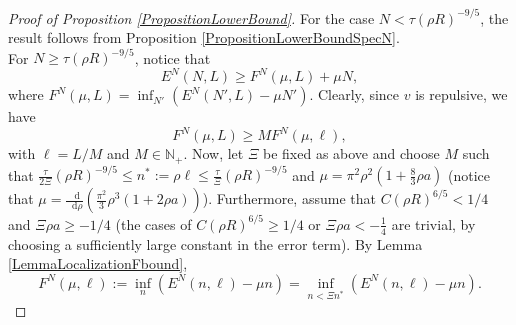 \documentclass[a4paper,11pt]{article}
\newcommand*\diff{\mathop{}\!\mathrm{d}}
\numberwithin{equation}{section}
\begin{document}
	\begin{proof}[Proof of Proposition \ref{PropositionLowerBound}]
		For the case $ N<\tau (\rho R)^{-9/5} $, the result follows from Proposition \ref{PropositionLowerBoundSpecN}.\\
		For $ N\geq \tau (\rho R)^{-9/5} $, notice that \begin{equation}
			E^N(N,L)\geq F^N(\mu,L)+\mu N,
		\end{equation}
		where $ F^N(\mu,L)=\inf_{N'}\left(E^N(N',L)-\mu N'\right) $. Clearly, since $v$ is repulsive, we have \begin{equation}
			F^N(\mu,L)\geq M F^N(\mu,\ell)\label{EqLocalizationF},
		\end{equation}
		with $ \ell=L/M $ and $ M\in \mathbb{N}_+ $. 
		Now, let $\Xi$ be fixed as above and choose $ M $ such that $ \frac{\tau}{2\Xi}\left(\rho R\right)^{-9/5}\leq n^*:=\rho\ell\leq \frac{\tau}{\Xi}\left(\rho R\right)^{-9/5} $ and $ \mu=\pi^2\rho^2\left(1+\frac{8}{3}\rho a\right) $ (notice that $ \mu=\frac{\diff}{\diff \rho}(\frac{\pi^2}{3}\rho^3(1+2\rho a))$). Furthermore, assume that $ C(\rho R)^{6/5}<  1/4 $ and $\Xi\rho a\geq -1/4$ (the cases of $ C(\rho R)^{6/5}\geq  1/4 $ or $ \Xi\rho a<-\frac{1}{4} $ are trivial, by choosing a sufficiently large constant in the error term). By Lemma \ref{LemmaLocalizationFbound},  \begin{equation}
			F^N(\mu,\ell):=\inf_{n}\left(E^N(n,\ell)-\mu n\right)=\inf_{n<\Xi n^*}\left(E^N(n,\ell)-\mu n\right).

\end{equation}
\end{proof}
\end{document}
